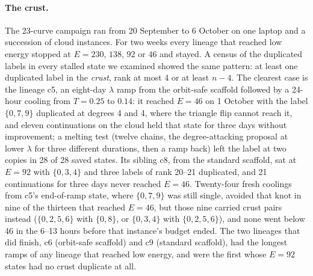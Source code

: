 \documentclass[11pt]{article}
\begin{document}
\paragraph{The crust.} The 23-curve campaign ran from 20 September to 6 October on one laptop and a succession of
cloud instances. For two weeks every lineage that reached low energy stopped at $E=230$, $138$, $92$ or $46$ and stayed. A
census of the duplicated labels in every stalled state we examined showed the same pattern: at least one duplicated
label in the \emph{crust}, rank at most 4 or at least $n-4$. The clearest case is the lineage c5, an eight-day
$\lambda$ ramp from the orbit-safe scaffold followed by a 24-hour cooling from $T=0.25$ to $0.14$: it reached $E=46$ on
1 October with the label $\{0,7,9\}$ duplicated at degrees 4 and 4, where the triangle flip cannot reach it, and
eleven continuations on the cloud held that state for three days without improvement; a melting test (twelve chains,
the degree-attacking proposal at lower $\lambda$ for three different durations, then a ramp back) left the label at
two copies in 28 of 28 saved states. Its sibling c8, from the standard scaffold, sat at
$E=92$ with $\{0,3,4\}$ and three labels of rank 20--21 duplicated, and 21 continuations for three days never reached
$E=46$. Twenty-four fresh coolings from c5's end-of-ramp state, where $\{0,7,9\}$ was still single, avoided that knot in
nine of the thirteen that reached $E=46$, but those nine carried crust pairs instead ($\{0,2,5,6\}$ with $\{0,8\}$, or
$\{0,3,4\}$ with $\{0,2,5,6\}$), and none went below 46 in the 6--13 hours before that instance's budget ended.
The two lineages that did finish, c6 (orbit-safe scaffold) and c9 (standard scaffold), had the longest ramps of any
lineage that reached low energy, and were the first whose $E=92$ states had no crust duplicate at all.
\end{document}
